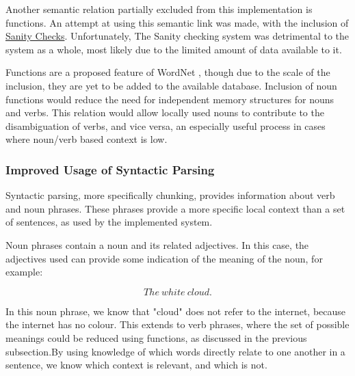 \documentclass[]{article}
\begin{document}
Another semantic relation partially excluded from this implementation is functions. An attempt at using this semantic link was made, with the inclusion of \hyperref[sec:Sanity]{Sanity Checks}. Unfortunately, The Sanity checking system was detrimental to the system as a whole, most likely due to the limited amount of data available to it.

Functions are a proposed feature of WordNet \cite{WN2Nouns}, though due to the scale of the inclusion, they are yet to be added to the available database. Inclusion of noun functions would reduce the need for independent memory structures for nouns and verbs. This relation would allow locally used nouns to contribute to the disambiguation of verbs, and vice versa, an especially useful process in cases where noun/verb based context is low.

\subsubsection{Improved Usage of Syntactic Parsing}
\label{sec:FutureSyntactic}
Syntactic parsing, more specifically chunking, provides information about verb and noun phrases. These phrases provide a more specific local context than a set of sentences, as used by the implemented system. 

Noun phrases contain a noun and its related adjectives. In this case, the adjectives used can provide some indication of the meaning of the noun, for example:

\[The\: white\: cloud.\]

In this noun phrase, we know that "cloud" does not refer to the internet, because the internet has no colour. This extends to verb phrases, where the set of possible meanings could be reduced using functions, as discussed in the previous subsection.By using knowledge of which words directly relate to one another in a sentence, we know which context is relevant, and which is not.



\newpage



\newpage
\appendix
\end{document}
